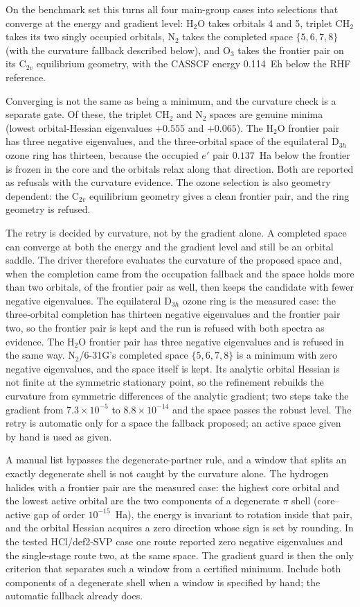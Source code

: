 On the benchmark set this turns all four main-group cases into
selections that converge at the energy and gradient level:
H$_2$O takes orbitals 4 and 5, triplet CH$_2$ takes its two singly
occupied orbitals, N$_2$ takes the completed space $\{5,6,7,8\}$ (with
the curvature fallback described below), and O$_3$ takes the frontier
pair on its C$_{2v}$ equilibrium geometry, with the CASSCF energy
0.114~Eh below the RHF reference.

Converging is not the same as being a minimum, and the curvature check
is a separate gate.  Of these, the triplet CH$_2$ and N$_2$ spaces are
genuine minima (lowest orbital-Hessian eigenvalues $+0.555$ and
$+0.065$).  The H$_2$O frontier pair has three negative eigenvalues,
and the three-orbital space of the equilateral D$_{3h}$ ozone ring has
thirteen, because the occupied $e'$ pair $0.137$~Ha below the frontier
is frozen in the core and the orbitals relax along that direction.
Both are reported as refusals with the curvature evidence.  The ozone
selection is also geometry dependent: the C$_{2v}$ equilibrium geometry
gives a clean frontier pair, and the ring geometry is refused.

The retry is decided by curvature, not by the gradient alone.  A
completed space can converge at both the energy and the gradient level
and still be an orbital saddle.  The driver therefore evaluates the
curvature of the proposed space and, when the completion came from the
occupation fallback and the space holds more than two orbitals, of the
frontier pair as well, then keeps the candidate with fewer negative
eigenvalues.  The equilateral D$_{3h}$ ozone ring is the measured case:
the three-orbital completion has thirteen negative eigenvalues and the
frontier pair two, so the frontier pair is kept and the run is refused
with both spectra as evidence.  The H$_2$O frontier pair has three
negative eigenvalues and is refused in the same way.  N$_2$/6-31G's
completed space $\{5,6,7,8\}$ is a minimum with zero negative
eigenvalues, and the space itself is kept.  Its analytic orbital Hessian
is not finite at the symmetric stationary point, so the refinement
rebuilds the curvature from symmetric differences of the analytic
gradient; two steps take the gradient from $7.3\times10^{-5}$ to
$8.8\times10^{-14}$ and the space passes the robust level.  The retry
is automatic only for a space the fallback proposed; an active space
given by hand is used as given.

A manual list bypasses the degenerate-partner rule, and a window that
splits an exactly degenerate shell is not caught by the curvature
alone.  The hydrogen halides with a frontier pair are the measured
case: the highest core orbital and the lowest active orbital are the
two components of a degenerate $\pi$ shell (core--active gap of order
$10^{-15}$~Ha), the energy is invariant to rotation inside that pair,
and the orbital Hessian acquires a zero direction whose sign is set by
rounding.  In the tested HCl/def2-SVP case one route reported zero
negative eigenvalues and the single-stage route two, at the same
space.  The gradient guard is then the only criterion that separates
such a window from a certified minimum.  Include both components of a
degenerate shell when a window is specified by hand; the automatic
fallback already does.

